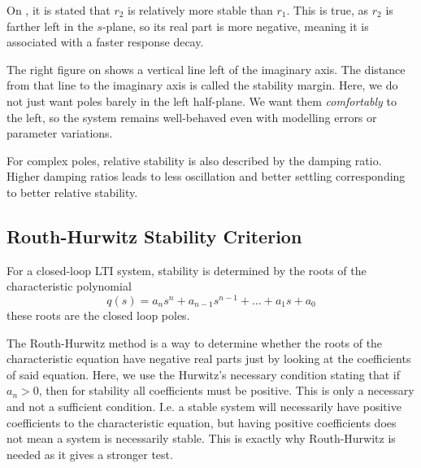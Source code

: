On , it is stated that $r_2$ is relatively more stable than $r_1$.
This is true, as $r_2$ is farther left in the $s$-plane, so its real part is more negative, meaning it is associated with a faster response decay.

The right figure on  shows a vertical line left of the imaginary axis.
The distance from that line to the imaginary axis is called the stability margin.
Here, we do not just want poles barely in the left half-plane.
We want them \textit{comfortably} to the left, so the system remains well-behaved even with modelling errors or parameter variations.

For complex poles, relative stability is also described by the damping ratio.
Higher damping ratios leads to less oscillation and better settling corresponding to  better relative stability. 


\subsection{Routh-Hurwitz Stability Criterion}
For a closed-loop LTI system, stability is determined by the roots of the characteristic polynomial
\begin{equation*}
  q(s) = a_n s^{n} + a_{n-1} s^{n-1} + \ldots  + a_1 s + a_0
\end{equation*}
these roots are the closed loop poles.

The Routh-Hurwitz method is a way to determine whether the roots of the characteristic equation have negative real parts just by looking at the coefficients of said equation.
Here, we use the Hurwitz's necessary condition stating that if $a_n > 0$, then for stability all coefficients must be positive.
This is only a necessary and not a sufficient condition.
I.e. a stable system will necessarily have positive coefficients to the characteristic equation, but having positive coefficients does not mean a system is necessarily stable.
This is exactly why Routh-Hurwitz is needed as it gives a stronger test.

